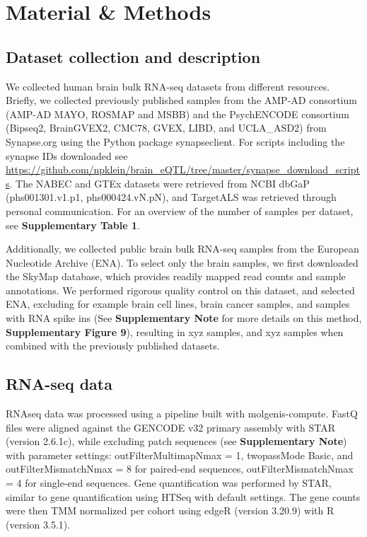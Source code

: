 {\section{Material \& Methods}
\subsection{Dataset collection and description }
We collected human brain bulk RNA-seq datasets from different resources. Briefly, we collected previously published samples from the AMP-AD consortium (AMP-AD MAYO\cite{hodesAcceleratingMedicinesPartnership2016}, ROSMAP\cite{hodesAcceleratingMedicinesPartnership2016} and MSBB\cite{hodesAcceleratingMedicinesPartnership2016}) and the PsychENCODE consortium (Bipseq2, BrainGVEX2, CMC78, GVEX, LIBD, and UCLA\_ASD2) from Synapse.org using the Python package synapseclient\cite{teamSynapseclientClientSynapse}. For scripts including the synapse IDs downloaded see \url{https://github.com/npklein/brain\_eQTL/tree/master/synapse\_download\_scripts}. The NABEC and GTEx datasets were retrieved from NCBI dbGaP (phs001301.v1.p1, phs000424.vN.pN), and TargetALS was retrieved through personal communication. For an overview of the number of samples per dataset, see \textbf{Supplementary Table 1}. 

Additionally, we collected public brain bulk RNA-seq samples from the European Nucleotide Archive (ENA). To select only the brain samples, we first downloaded the SkyMap database\cite{tsuiExtractingAllelicRead2018}, which provides readily mapped read counts and sample annotations. We performed rigorous quality control on this dataset, and selected ENA, excluding for example brain cell lines, brain cancer samples, and samples with RNA spike ins (See \textbf{Supplementary Note} for more details on this method, \textbf{Supplementary Figure 9}), resulting in xyz samples, and xyz samples when combined with the previously published datasets. 

\subsection{RNA-seq data}
RNAseq data was processed using a pipeline built with molgenis-compute\cite{byelasMOLGENISBasedComputational2011}. FastQ files were aligned against the GENCODE\cite{frankishGENCODEReferenceAnnotation2019} v32 primary assembly with STAR\cite{dobinSTARUltrafastUniversal2013} (version 2.6.1c), while excluding patch sequences (see \textbf{Supplementary Note}) with parameter settings: outFilterMultimapNmax = 1, twopassMode Basic, and outFilterMismatchNmax = 8 for paired-end sequences, outFilterMismatchNmax = 4 for single-end sequences. Gene quantification was performed by STAR, similar to gene quantification using HTSeq\cite{andersHTSeqPythonFramework2015} with default settings. The gene counts were then TMM\cite{robinsonScalingNormalizationMethod2010} normalized per cohort using edgeR\cite{robinsonEdgeRBioconductorPackage2010} (version 3.20.9) with R\cite{rcoreteamLanguageEnvironmentStatistical2017} (version 3.5.1). 

}

